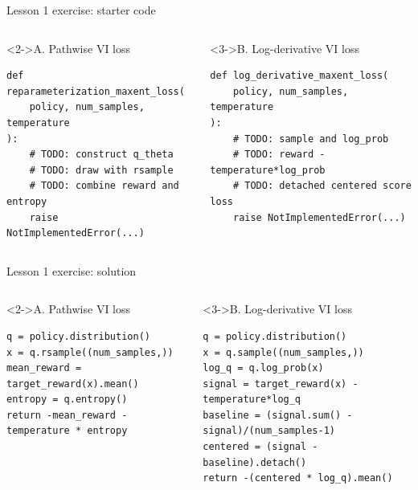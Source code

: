 \documentclass[aspectratio=169,10pt]{beamer}
\begin{document}
\begin{frame}[fragile]{Lesson 1 exercise: starter code}
  \centering
  \vspace{0.20cm}

  \begin{columns}[T,onlytextwidth]
      \begin{block}<2->{A. Pathwise VI loss}
\scriptsize
\begin{verbatim}
def reparameterization_maxent_loss(
    policy, num_samples, temperature
):
    # TODO: construct q_theta
    # TODO: draw with rsample
    # TODO: combine reward and entropy
    raise NotImplementedError(...)
\end{verbatim}
      \end{block}
      \begin{block}<3->{B. Log-derivative VI loss}
\scriptsize
\begin{verbatim}
def log_derivative_maxent_loss(
    policy, num_samples, temperature
):
    # TODO: sample and log_prob
    # TODO: reward - temperature*log_prob
    # TODO: detached centered score loss
    raise NotImplementedError(...)
\end{verbatim}
      \end{block}
  \end{columns}
\end{frame}

\begin{frame}[fragile]{Lesson 1 exercise: solution}
  \centering
  \vspace{0.12cm}

  \begin{columns}[T,onlytextwidth]
      \begin{block}<2->{A. Pathwise VI loss}
\scriptsize
\begin{verbatim}
q = policy.distribution()
x = q.rsample((num_samples,))
mean_reward = target_reward(x).mean()
entropy = q.entropy()
return -mean_reward - temperature * entropy
\end{verbatim}
      \end{block}
      \begin{block}<3->{B. Log-derivative VI loss}
\scriptsize
\begin{verbatim}
q = policy.distribution()
x = q.sample((num_samples,))
log_q = q.log_prob(x)
signal = target_reward(x) - temperature*log_q
baseline = (signal.sum() - signal)/(num_samples-1)
centered = (signal - baseline).detach()
return -(centered * log_q).mean()
\end{verbatim}
      \end{block}
  \end{columns}
\end{frame}
\end{document}
